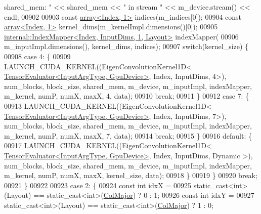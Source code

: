\begin{DoxyCode}
{       shared\_mem: " << shared\_mem << " in stream " << m\_device.stream() << endl;}
00902 
00903         \textcolor{keyword}{const} \hyperlink{class_eigen_1_1array}{array<Index, 1>} indices(m\_indices[0]);
00904         \textcolor{keyword}{const} \hyperlink{class_eigen_1_1array}{array<Index, 1>} kernel\_dims(m\_kernelImpl.dimensions()[0]);
00905         \hyperlink{class_eigen_1_1internal_1_1_index_mapper}{internal::IndexMapper<Index, InputDims, 1, Layout>}
       indexMapper(
00906             m\_inputImpl.dimensions(), kernel\_dims, indices);
00907         \textcolor{keywordflow}{switch}(kernel\_size) \{
00908           \textcolor{keywordflow}{case} 4: \{
00909             LAUNCH\_CUDA\_KERNEL((EigenConvolutionKernel1D<
      \hyperlink{struct_eigen_1_1_tensor_evaluator}{TensorEvaluator<InputArgType, GpuDevice>}, Index, InputDims, 4>), 
      num\_blocks, block\_size, shared\_mem, m\_device, m\_inputImpl, indexMapper, m\_kernel, numP, numX, maxX, 4, data);
00910             \textcolor{keywordflow}{break};
00911           \}
00912           \textcolor{keywordflow}{case} 7: \{
00913             LAUNCH\_CUDA\_KERNEL((EigenConvolutionKernel1D<
      \hyperlink{struct_eigen_1_1_tensor_evaluator}{TensorEvaluator<InputArgType, GpuDevice>}, Index, InputDims, 7>), 
      num\_blocks, block\_size, shared\_mem, m\_device, m\_inputImpl, indexMapper, m\_kernel, numP, numX, maxX, 7, data);
00914             \textcolor{keywordflow}{break};
00915           \}
00916           \textcolor{keywordflow}{default}: \{
00917             LAUNCH\_CUDA\_KERNEL((EigenConvolutionKernel1D<
      \hyperlink{struct_eigen_1_1_tensor_evaluator}{TensorEvaluator<InputArgType, GpuDevice>}, Index, InputDims, Dynamic
      >), num\_blocks, block\_size, shared\_mem, m\_device, m\_inputImpl, indexMapper, m\_kernel, numP, numX, maxX, 
      kernel\_size, data);
00918           \}
00919         \}
00920         \textcolor{keywordflow}{break};
00921       \}
00922 
00923       \textcolor{keywordflow}{case} 2: \{
00924         \textcolor{keyword}{const} \textcolor{keywordtype}{int} idxX =
00925             \textcolor{keyword}{static\_cast<}\textcolor{keywordtype}{int}\textcolor{keyword}{>}(Layout) == static\_cast<int>(\hyperlink{group__enums_ggaacded1a18ae58b0f554751f6cdf9eb13a0cbd4bdd0abcfc0224c5fcb5e4f6669a}{ColMajor}) ? 0 : 1;
00926         \textcolor{keyword}{const} \textcolor{keywordtype}{int} idxY =
00927             \textcolor{keyword}{static\_cast<}\textcolor{keywordtype}{int}\textcolor{keyword}{>}(Layout) == static\_cast<int>(\hyperlink{group__enums_ggaacded1a18ae58b0f554751f6cdf9eb13a0cbd4bdd0abcfc0224c5fcb5e4f6669a}{ColMajor}) ? 1 : 0;

\end{DoxyCode}
